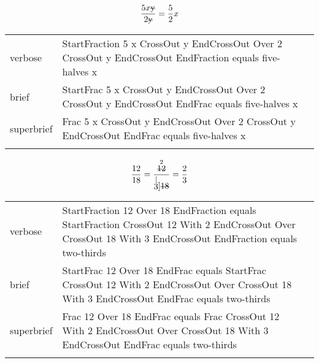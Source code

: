 
\label{sec:cancellation}

\R
\E \[\frac{5x\sout{y}}{2\sout{y}}=\frac{5}{2}x\]
\begin{longtable}[c]{@{}lll@{}}
\toprule\addlinespace
verbose & StartFraction 5 x CrossOut y EndCrossOut Over 2 CrossOut y
EndCrossOut EndFraction equals five-halves x &

\\\addlinespace
brief & StartFrac 5 x CrossOut y EndCrossOut Over 2 CrossOut y
EndCrossOut EndFrac equals five-halves x &

\\\addlinespace
superbrief & Frac 5 x CrossOut y EndCrossOut Over 2 CrossOut y
EndCrossOut EndFrac equals five-halves x &

\\\addlinespace
\bottomrule
\end{longtable}


\R
\E \[\frac{12}{18}=\frac{\stackrel{2}{\sout{12}}}{\stackrel[3]{\sout{18}}{}}=\frac{2}{3}\]
\begin{longtable}[c]{@{}lll@{}}
\toprule\addlinespace
verbose & StartFraction 12 Over 18 EndFraction equals StartFraction
CrossOut 12 With 2 EndCrossOut Over CrossOut 18 With 3 EndCrossOut
EndFraction equals two-thirds &

\\\addlinespace
brief & StartFrac 12 Over 18 EndFrac equals StartFrac CrossOut 12 With 2
EndCrossOut Over CrossOut 18 With 3 EndCrossOut EndFrac equals
two-thirds &

\\\addlinespace
superbrief & Frac 12 Over 18 EndFrac equals Frac CrossOut 12 With 2
EndCrossOut Over CrossOut 18 With 3 EndCrossOut EndFrac equals
two-thirds &

\\\addlinespace
\bottomrule
\end{longtable}



